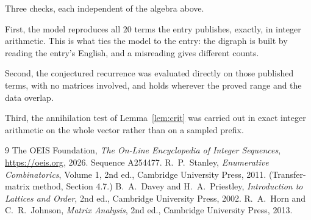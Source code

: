 \documentclass[11pt,a4paper]{article}
\theoremstyle{plain}
\theoremstyle{definition}
\begin{document}
Three checks, each independent of the algebra above.

First, the model reproduces all $20$ terms the entry publishes, exactly, in integer
arithmetic. This is what ties the model to the entry: the digraph is built by reading the
entry's English, and a misreading gives different counts.

Second, the conjectured recurrence was evaluated directly on those published terms, with no
matrices involved, and holds wherever the proved range and the data overlap.

Third, the annihilation test of Lemma~\ref{lem:crit} was carried out in exact integer
arithmetic on the whole vector rather than on a sampled prefix.

\begin{thebibliography}{9}
 The OEIS Foundation, \emph{The On-Line Encyclopedia of Integer
Sequences}, \url{https://oeis.org}, 2026. Sequence A254477.
 R.~P.~Stanley, \emph{Enumerative Combinatorics}, Volume 1, 2nd ed.,
Cambridge University Press, 2011. (Transfer-matrix method, Section 4.7.)
 B.~A.~Davey and H.~A.~Priestley, \emph{Introduction to Lattices and
Order}, 2nd ed., Cambridge University Press, 2002.
 R.~A.~Horn and C.~R.~Johnson, \emph{Matrix Analysis}, 2nd ed., Cambridge
University Press, 2013.
\end{thebibliography}
\end{document}

